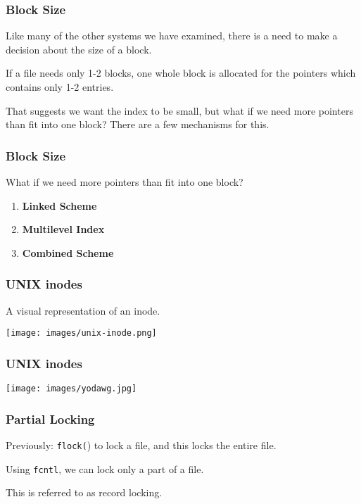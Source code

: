 \begin{frame}
	\frametitle{Block Size}

	Like many of the other systems we have examined, there is a need to make a decision about the size of a block.

	If a file needs only 1-2 blocks, one whole block is allocated for the pointers which contains only 1-2 entries.

	That suggests we want the index to be small, but what if we need more pointers than fit into one block? There are a few mechanisms for this.


\end{frame}

\begin{frame}
	\frametitle{Block Size}

	What if we need more pointers than fit into one block?

	\begin{enumerate}
		\item \textbf{Linked Scheme}
		\item \textbf{Multilevel Index}
		\item \textbf{Combined Scheme}
	\end{enumerate}


\end{frame}

\begin{frame}
	\frametitle{UNIX inodes}

	A visual representation of an inode.

	\begin{center}
		\texttt{[image: images/unix-inode.png]}
	\end{center}

\end{frame}

\begin{frame}
	\frametitle{UNIX inodes}

	\begin{center}
		\texttt{[image: images/yodawg.jpg]}
	\end{center}

\end{frame}


\begin{frame}
	\frametitle{Partial Locking}

	Previously: \texttt{flock(}) to lock a file, and this locks the entire file.

	Using \texttt{fcntl}, we can lock only a part of a file.

	This is referred to as \alert{record locking}.

\end{frame}


